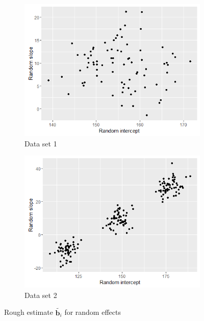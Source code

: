 \begin{figure}[!htb]
\centering
	\begin{subfigure}[b]{0.4\textwidth}
		\includegraphics[width=\textwidth]{mainmatter/chapter_5_simulation_study/ds_simple_randplot.png}
       \caption{\label{fig : ds_simple_randplot}Data set 1}
	\end{subfigure}    
    \begin{subfigure}[b]{0.4\textwidth}
		\includegraphics[width=\textwidth]{mainmatter/chapter_5_simulation_study/ds_3wellsep_randplot.png}
        \caption{\label{fig : ds_3wellsep_randplot}Data set 2}
	\end{subfigure}
\caption{\label{fig : ds_simple_n_3wellsep}Rough estimate $\tilde{\boldsymbol{b}_i}$ for random effects}
\end{figure}


